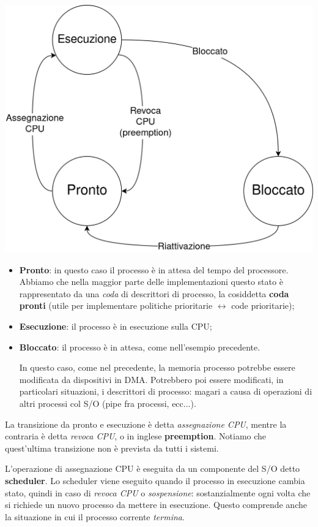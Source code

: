 \documentclass[a4paper,11pt]{article}
\begin{document}
\begin{center}
	\includegraphics[scale=0.25]{../figures/proc_esecuzione_pronto_bloccato.png}
\end{center}

\begin{itemize}
	\item \textbf{Pronto}: in questo caso il processo è in attesa del tempo del processore. Abbiamo che nella maggior parte delle implementazioni questo stato è rappresentato da una \textit{coda} di descrittori di processo, la cosiddetta \textbf{coda pronti} (utile per implementare politiche prioritarie $\leftrightarrow$ code prioritarie);
	\item \textbf{Esecuzione}: il processo è in esecuzione sulla CPU;
	\item \textbf{Bloccato}: il processo è in attesa, come nell'esempio precedente. 

		In questo caso, come nel precedente, la memoria processo potrebbe essere modificata da dispositivi in DMA.
	Potrebbero poi essere modificati, in particolari situazioni, i descrittori di processo: magari a causa di operazioni di altri processi col S/O (pipe fra processi, ecc...).	
\end{itemize}

La transizione da pronto e esecuzione è detta \textit{assegnazione CPU}, mentre la contraria è detta \textit{revoca CPU}, o in inglese \textbf{preemption}.
Notiamo che quest'ultima transizione non è prevista da tutti i sistemi.

L'operazione di assegnazione CPU è eseguita da un componente del S/O detto \textbf{scheduler}. Lo scheduler viene eseguito quando il processo in esecuzione cambia stato, quindi in caso di \textit{revoca CPU} o \textit{sospensione}: sostanzialmente ogni volta che si richiede un nuovo processo da mettere in esecuzione.
Questo comprende anche la situazione in cui il processo corrente \textit{termina}.
\end{document}
